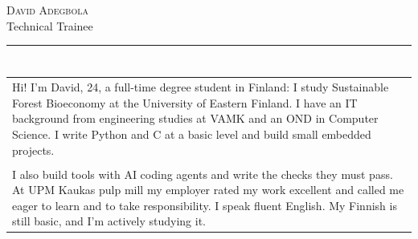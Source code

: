 \documentclass[a4paper,11pt]{article}
\begin{document}
\small
\setlength{\cvlabelw}{3.2cm}
\titlespacing{\section}{0pt}{0.55em}{2pt}

\begin{cvheader}
\par{\centering
		{\Huge \textsc{David Adegbola}}\\[0.4em]
		{\Large Technical Trainee}
	\bigskip\par}

\hrule
\vspace{0.5em}
\end{cvheader}

\section{}
\begin{tabular}{p{}}
 Hi! I'm David, 24, a full-time degree student in Finland: I study Sustainable Forest Bioeconomy at the University of Eastern Finland. I have an IT background from engineering studies at VAMK and an OND in Computer Science. I write Python and C at a basic level and build small embedded projects.\\\\

 I also build tools with AI coding agents and write the checks they must pass. At UPM Kaukas pulp mill my employer rated my work excellent and called me eager to learn and to take responsibility. I speak fluent English. My Finnish is still basic, and I'm actively studying it.
\end{tabular}

\section{}
\end{document}
